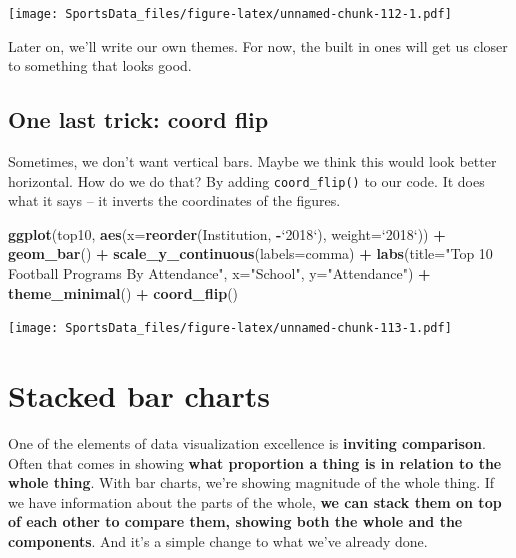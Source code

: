 \documentclass[]{book}
\newenvironment{Shaded}{\begin{snugshade}}{\end{snugshade}}
\newcommand{\DataTypeTok}[1]{\textcolor[rgb]{0.13,0.29,0.53}{#1}}
\newcommand{\KeywordTok}[1]{\textcolor[rgb]{0.13,0.29,0.53}{\textbf{#1}}}
\newcommand{\NormalTok}[1]{#1}
\newcommand{\OperatorTok}[1]{\textcolor[rgb]{0.81,0.36,0.00}{\textbf{#1}}}
\newcommand{\StringTok}[1]{\textcolor[rgb]{0.31,0.60,0.02}{#1}}
\begin{document}
\texttt{[image: SportsData\_files/figure-latex/unnamed-chunk-112-1.pdf]}

Later on, we'll write our own themes. For now, the built in ones will get us closer to something that looks good.

\hypertarget{one-last-trick-coord-flip}{%
\section{One last trick: coord flip}\label{one-last-trick-coord-flip}}

Sometimes, we don't want vertical bars. Maybe we think this would look better horizontal. How do we do that? By adding \texttt{coord\_flip()} to our code. It does what it says -- it inverts the coordinates of the figures.

\begin{Shaded}
\begin{Highlighting}[]
\KeywordTok{ggplot}\NormalTok{(top10, }\KeywordTok{aes}\NormalTok{(}\DataTypeTok{x=}\KeywordTok{reorder}\NormalTok{(Institution, }\OperatorTok{-}\StringTok{`}\DataTypeTok{2018}\StringTok{`}\NormalTok{), }\DataTypeTok{weight=}\StringTok{`}\DataTypeTok{2018}\StringTok{`}\NormalTok{)) }\OperatorTok{+}\StringTok{ }
\StringTok{  }\KeywordTok{geom_bar}\NormalTok{() }\OperatorTok{+}\StringTok{ }
\StringTok{  }\KeywordTok{scale_y_continuous}\NormalTok{(}\DataTypeTok{labels=}\NormalTok{comma) }\OperatorTok{+}\StringTok{ }
\StringTok{  }\KeywordTok{labs}\NormalTok{(}\DataTypeTok{title=}\StringTok{"Top 10 Football Programs By Attendance"}\NormalTok{, }\DataTypeTok{x=}\StringTok{"School"}\NormalTok{, }\DataTypeTok{y=}\StringTok{"Attendance"}\NormalTok{) }\OperatorTok{+}\StringTok{ }
\StringTok{  }\KeywordTok{theme_minimal}\NormalTok{() }\OperatorTok{+}\StringTok{ }
\StringTok{  }\KeywordTok{coord_flip}\NormalTok{()}
\end{Highlighting}
\end{Shaded}

\texttt{[image: SportsData\_files/figure-latex/unnamed-chunk-113-1.pdf]}

\hypertarget{stacked-bar-charts}{%
\chapter{Stacked bar charts}\label{stacked-bar-charts}}

One of the elements of data visualization excellence is \textbf{inviting comparison}. Often that comes in showing \textbf{what proportion a thing is in relation to the whole thing}. With bar charts, we're showing magnitude of the whole thing. If we have information about the parts of the whole, \textbf{we can stack them on top of each other to compare them, showing both the whole and the components}. And it's a simple change to what we've already done.
\end{document}
